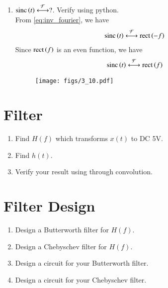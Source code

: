 \documentclass[journal,12pt,twocolumn]{IEEEtran}
\renewcommand\thesection{\arabic{section}}
\begin{document}
\begin{enumerate}[label=\thesection.\arabic*
,ref=\thesection.\theenumi]
\item 
$\text{sinc}\left(t\right)\overset{\mathcal{F}}{ \longleftrightarrow}?$. Verify using python. \\
\solution From \eqref{eq:inv_fourier}, we have 
\begin{align}
	\text{sinc}\left(t\right)\overset{\mathcal{F}}{ \longleftrightarrow}\text{rect}\left(-f\right)
    \label{eq:fourier-sinc}
\end{align}
Since $\text{rect}\left(f\right)$ is an even function, we have 
\begin{align}
	\text{sinc}\left(t\right) \overset{\mathcal{F}}{ \longleftrightarrow} \text{rect}\left(f\right)
\end{align}
\begin{figure}[!ht]
	\centering
	\texttt{[image: figs/3\_10.pdf]}
\end{figure}


\end{enumerate}



\section{Filter}
\begin{enumerate}[label=\thesection.\arabic*
,ref=\thesection.\theenumi]
\item Find $H(f)$ which transforms $x(t)$ to DC 5V.
\item Find $h(t)$.
\item Verify your result using  through convolution.
\end{enumerate}
\section{Filter Design}
\begin{enumerate}[label=\thesection.\arabic*
,ref=\thesection.\theenumi]
\item Design a Butterworth filter for $H(f)$.
\item Design a Chebyschev filter for $H(f)$.
\item Design a circuit for your Butterworth filter.
\item Design a circuit for your Chebyschev filter.
\end{enumerate}
\end{document}
